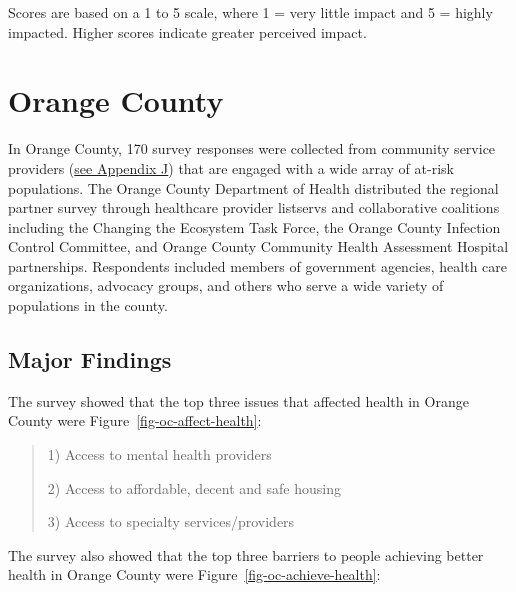 \documentclass[
  english,
  letterpaper,
]{report}
\begin{document}
\begin{tcolorbox}[enhanced jigsaw, breakable, leftrule=.75mm, title=\textcolor{quarto-callout-note-color}{\faInfo}\hspace{0.5em}{Note}, bottomrule=.15mm, opacityback=0, left=2mm, colback=white, bottomtitle=1mm, coltitle=black, colbacktitle=quarto-callout-note-color!10!white, colframe=quarto-callout-note-color-frame, opacitybacktitle=0.6, toptitle=1mm, titlerule=0mm, arc=.35mm, rightrule=.15mm, toprule=.15mm]

Scores are based on a 1 to 5 scale, where 1 = very little impact and 5 =
highly impacted. Higher scores indicate greater perceived impact.

\end{tcolorbox}

\section{Orange County}\label{orange-county-2}

In Orange County, 170 survey responses were collected from community
service providers
(\hyperref[sec-appendix-j-community-partner-survey-references]{see
Appendix J}) that are engaged with a wide array of at-risk populations.
The Orange County Department of Health distributed the regional partner
survey through healthcare provider listservs and collaborative
coalitions including the Changing the Ecosystem Task Force, the Orange
County Infection Control Committee, and Orange County Community Health
Assessment Hospital partnerships. Respondents included members of
government agencies, health care organizations, advocacy groups, and
others who serve a wide variety of populations in the county.

\subsection{Major Findings}\label{major-findings-1}

The survey showed that the top three issues that affected health in
Orange County were Figure~\ref{fig-oc-affect-health}:

\begin{quote}
1) Access to mental health providers

2) Access to affordable, decent and safe housing

3) Access to specialty services/providers
\end{quote}

The survey also showed that the top three barriers to people achieving
better health in Orange County were Figure~\ref{fig-oc-achieve-health}:
\end{document}
